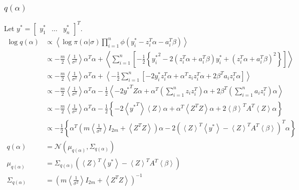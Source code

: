 \documentclass[11pt]{article}
\begin{document}
\subsubsection{$q\left(\alpha\right)$}
Let $y^{*} = \begin{bmatrix}y_{1}^{*} & \ldots & y_{n}^{*}\end{bmatrix}^{T}$.
\begin{align*}
  \log q\left(\alpha\right) &\propto \left\langle \log \pi\left(\alpha|\sigma\right)\prod_{i=1}^{n}\phi\left(y_{i}^{*}-z_{i}^{T}\alpha - a_{i}^{T}\beta\right)\right\rangle\\
  &\propto -\frac{m}{2}\left\langle \frac{1}{\sigma^{2}}\right\rangle\alpha^{T}\alpha +\left\langle \sum_{i=1}^{n}\left[-\frac{1}{2}\left\{{y_{i}^{*}}^{2} -2\left(z_{i}^{T}\alpha + a_{i}^{T}\beta\right)y_{i}^{*} + \left(z_{i}^{T}\alpha + a_{i}^{T}\beta\right)^{2}\right\}\right]\right\rangle\\
  &\propto -\frac{m}{2}\left\langle \frac{1}{\sigma^{2}} \right\rangle \alpha^{T}\alpha + \left\langle -\frac{1}{2}\sum_{i=1}^{n}\left[-2y_{i}^{*}z_{i}^{T}\alpha +\alpha^{T}z_{i}z_{i}^{T}\alpha +2\beta^{T}a_{i}z_{i}^{T}\alpha \right]\right\rangle\\
  &\propto -\frac{m}{2}\left\langle \frac{1}{\sigma^{2}}\right\rangle \alpha^{T}\alpha -\frac{1}{2}\left\langle -2{y^{*}}^{T}Z\alpha + \alpha^{T}\left(\sum_{i=1}^{n}z_{i}z_{i}^{T}\right)\alpha + 2\beta^{T}\left(\sum_{i=1}^{n}a_{i}z_{i}^{T}\right)\alpha\right\rangle \\
  &\propto -\frac{m}{2}\left\langle \frac{1}{\sigma^{2}}\right\rangle \alpha^{T}\alpha -\frac{1}{2}\left\{-2\left\langle {y^{*}}^{T}\right\rangle \left\langle Z\right\rangle \alpha + \alpha^{T}\left\langle Z^{T}Z \right\rangle \alpha + 2\left\langle\beta\right\rangle^{T} A^{T}\left\langle Z\right\rangle \alpha \right\}\\
  &\propto -\frac{1}{2}\left\{\alpha^{T}\left(m\left\langle \frac{1}{\sigma^{2}}\right\rangle I_{2m} + \left\langle Z^{T}Z \right\rangle\right)\alpha-2\left(\left\langle Z\right\rangle^{T}\left\langle y^{*}\right\rangle -\left\langle Z \right\rangle^{T}A^{T}\left\langle \beta\right\rangle \right)^{T}\alpha \right\}\\
  q\left(\alpha\right) &= \mathcal{N}\left(\mu_{q\left(\alpha\right)}, \Sigma_{q\left(\alpha\right)}\right)\\
  \mu_{q\left(\alpha\right)} &= \Sigma_{q\left(\alpha\right)}\left(\left\langle Z\right\rangle^{T}\left\langle y^{*}\right\rangle -\left\langle Z \right\rangle^{T}A^{T}\left\langle \beta\right\rangle \right)\\
  \Sigma_{q\left(\alpha\right)} &= \left(m\left\langle \frac{1}{\sigma^{2}}\right\rangle I_{2m} + \left\langle Z^{T}Z \right\rangle\right)^{-1}
\end{align*}
\end{document}

